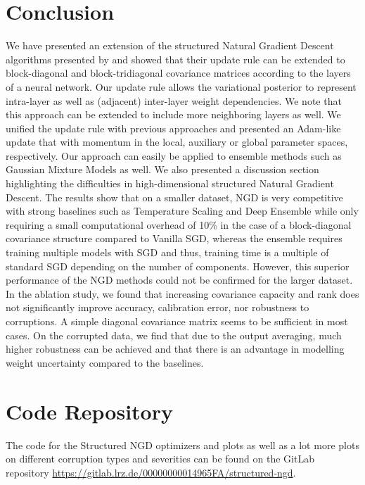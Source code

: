 \documentclass[a4paper, 11pt, oneside]{scrartcl}
\theoremstyle{break}
\numberwithin{equation}{section}
\begin{document}
	\section{Conclusion}
		We have presented an extension of the structured Natural Gradient Descent algorithms presented by \parencite{LNK+21} and showed that their update rule can be extended to block-diagonal and block-tridiagonal covariance matrices according to the layers of a neural network. 
		Our update rule allows the variational posterior to represent intra-layer as well as (adjacent) inter-layer weight dependencies.
		We note that this approach can be extended to include more neighboring layers as well. 
		We unified the update rule with previous approaches \parencite{LSK20} and presented an Adam-like update that with momentum in the local, auxiliary or global parameter spaces, respectively. 
		Our approach can easily be applied to ensemble methods such as Gaussian Mixture Models as well. 
		We also presented a discussion section highlighting the difficulties in high-dimensional structured Natural Gradient Descent. 
		The results show that on a smaller dataset, NGD is very competitive with strong baselines such as Temperature Scaling and Deep Ensemble while only requiring a small computational overhead of 10\% in the case of a block-diagonal covariance structure compared to Vanilla SGD, whereas the ensemble requires training multiple models with SGD and thus, training time is a multiple of standard SGD depending on the number of components. 
		However, this superior performance of the NGD methods could not be confirmed for the larger dataset. 
		In the ablation study, we found that increasing covariance capacity and rank does not significantly improve accuracy, calibration error, nor robustness to corruptions. 
		A simple diagonal covariance matrix seems to be sufficient in most cases.
		On the corrupted data, we find that due to the output averaging, much higher robustness can be achieved and that there is an advantage in modelling weight uncertainty compared to the baselines.

	\newpage
	\printbibliography
	\newpage
	\appendix
		\section{Code Repository}
			The code for the Structured NGD optimizers and plots as well as a lot more plots on different corruption types and severities can be found on the GitLab repository \url{https://gitlab.lrz.de/00000000014965FA/structured-ngd}.
\end{document}

